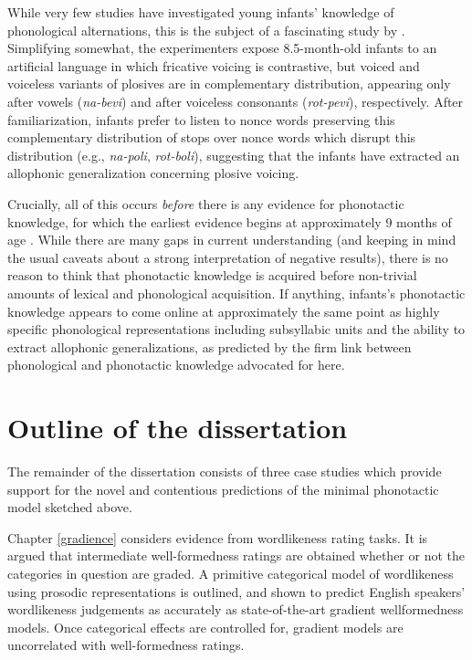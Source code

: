 While very few studies have investigated young infants' knowledge of phonological alternations, this is the subject of a fascinating study by \citet{White2008}.
Simplifying somewhat, the experimenters expose 8.5-month-old infants to an artificial language in which fricative voicing is contrastive, but voiced and voiceless variants of plosives are in complementary distribution, appearing only after vowels (\emph{na-bevi}) and after voiceless consonants (\emph{rot-pevi}), respectively.
After familiarization, infants prefer to listen to nonce words preserving this complementary distribution of stops over nonce words which disrupt this distribution (e.g., \emph{na-poli}, \emph{rot-boli}), suggesting that the infants have extracted an allophonic generalization concerning plosive voicing.

Crucially, all of this occurs \emph{before} there is any evidence for phonotactic knowledge, for which the earliest evidence begins at approximately 9 months of age \citep{Friederici1993,Jusczyk1993b,Jusczyk1994}.
While there are many gaps in current understanding (and keeping in mind the usual caveats about a strong interpretation of negative results), there is no reason to think that phonotactic knowledge is acquired before non-trivial amounts of lexical and phonological acquisition.
If anything, infants's phonotactic knowledge appears to come online at approximately the same point as highly specific phonological representations including subsyllabic units and the ability to extract allophonic generalizations, as predicted by the firm link between phonological and phonotactic knowledge advocated for here.

\section{Outline of the dissertation}

The remainder of the dissertation consists of three case studies which provide support for the novel and contentious predictions of the minimal phonotactic model sketched above.

Chapter \ref{gradience} considers evidence from wordlikeness rating tasks. It is argued that intermediate well-formedness ratings are obtained whether or not the categories in question are graded. A primitive categorical model of wordlikeness using prosodic representations is outlined, and shown to predict English speakers' wordlikeness judgements as accurately as state-of-the-art gradient wellformedness models. Once categorical effects are controlled for, gradient models are uncorrelated with well-formedness ratings.

